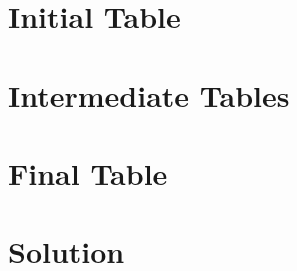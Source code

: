 \documentclass{report}
\begin{document}
\chapter*{Initial Table}



\chapter*{Intermediate Tables}



\chapter*{Final Table}



\chapter*{Solution}


\end{document}
